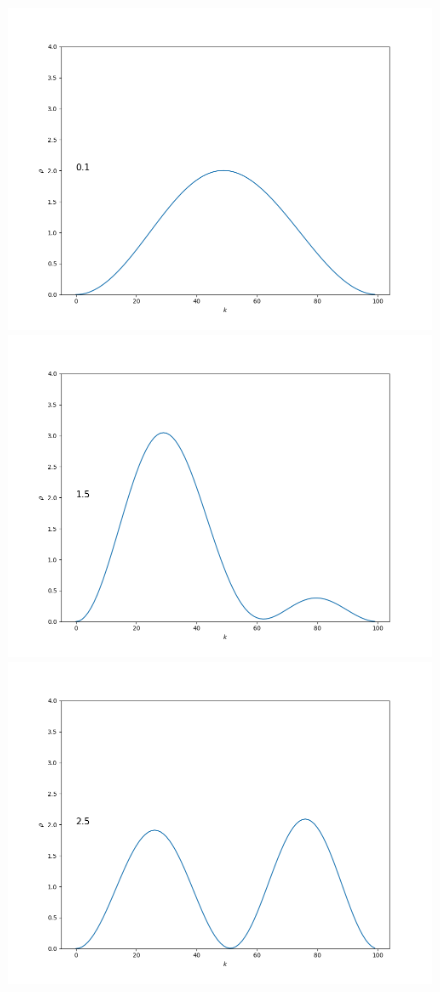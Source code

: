 \documentclass[11pt,a4paper]{article}
\begin{document}
\begin{figure}[ht!]
    \centering
    \begin{multicols}{3}
        \includegraphics[width=\linewidth]{../figures/frame_n=1_time=0.1.png}
        \includegraphics[width=\linewidth]{../figures/frame_n=1_time=1.5.png}
        \includegraphics[width=\linewidth]{../figures/frame_n=1_time=2.5.png}

\end{multicols}
\end{figure}
\end{document}
